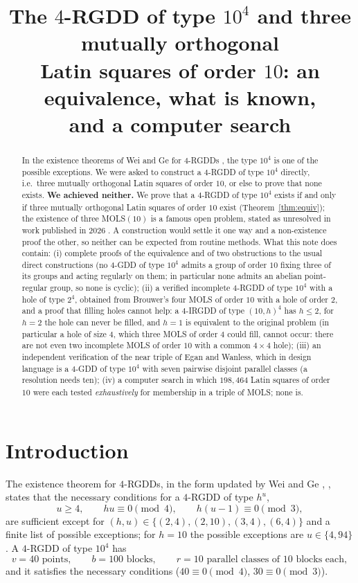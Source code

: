 \documentclass[11pt]{article}
\title{The $4$-RGDD of type $10^{4}$ and three mutually orthogonal\\
Latin squares of order $10$:
an equivalence, what is known,\\ and a computer search}
\author{}
\date{}
\theoremstyle{remark}
\begin{document}
\maketitle

\begin{abstract}
In the existence theorems of Wei and Ge for $4$-RGDDs
\cite[Theorem~4.21]{WG14}, \cite[Theorem~5.2]{WG17} the type $10^{4}$ is one of the
possible exceptions.  We were asked to construct a $4$-RGDD of type $10^{4}$
directly, i.e.\ three mutually orthogonal Latin squares of order $10$, or else to
prove that none exists.
\textbf{We achieved neither.}
We prove that a $4$-RGDD of type $10^{4}$ exists if and only if three mutually
orthogonal Latin squares of order $10$ exist (Theorem~\ref{thm:equiv}); the
existence of three MOLS$(10)$ is a famous open problem, stated as unresolved in work
published in 2026 \cite{BKS26}.  A construction would settle it one way and a
non-existence proof the other, so neither can be expected from routine methods.
What this note does contain:
(i) complete proofs of the equivalence and of two obstructions to the usual direct
constructions (no $4$-GDD of type $10^{4}$ admits a group of order $10$ fixing three of
its groups and acting regularly on them; in particular none admits an abelian
point-regular group, so none is cyclic);
(ii) a verified incomplete $4$-RGDD of type $10^{4}$ with a hole of type $2^{4}$,
obtained from Brouwer's four MOLS of order $10$ with a hole of order $2$, and a proof
that filling holes cannot help: a $4$-IRGDD of type $(10,h)^{4}$ has $h\le 2$, for $h=2$
the hole can never be filled, and $h=1$ is equivalent to the original problem (in
particular a hole of size $4$, which three MOLS of order $4$ could fill, cannot occur: there
are not even two incomplete MOLS of order $10$ with a common $4\times 4$ hole);
(iii) an independent verification of the near triple of Egan and Wanless, which in
design language is a $4$-GDD of type $10^{4}$ with seven pairwise disjoint parallel
classes (a resolution needs ten);
(iv) a computer search in which \textbf{$198{,}464$} Latin squares of order $10$ were each
tested \emph{exhaustively} for membership in a triple of MOLS; none is.
\end{abstract}

\section{Introduction}

The existence theorem for $4$-RGDDs, in the form updated by Wei and Ge
\cite[Theorem~4.21]{WG14}, \cite[Theorem~5.2]{WG17}, states that the
necessary conditions for a $4$-RGDD of type $h^{u}$,
\[
u\ge 4,\qquad hu\equiv 0 \pmod 4,\qquad h(u-1)\equiv 0\pmod 3,
\]
are sufficient except for $(h,u)\in\{(2,4),(2,10),(3,4),(6,4)\}$ and a finite list of
possible exceptions; for $h=10$ the possible exceptions are $u\in\{4,94\}$
\cite[Theorem~5.2]{WG17}.  A $4$-RGDD of type $10^{4}$ has
\[
v=40 \text{ points},\qquad b=100 \text{ blocks},\qquad r=10 \text{ parallel classes of } 10 \text{ blocks each},
\]
and it satisfies the necessary conditions ($40\equiv 0 \pmod 4$, $30\equiv 0\pmod 3$).
\end{document}
